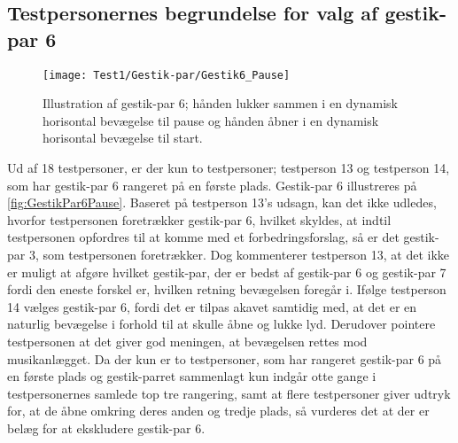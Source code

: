 \subsection{Testpersonernes begrundelse for valg af gestik-par 6}
\label{TestresultaterValgAfGestikkerBegrundelseGP6}
%
\begin{figure}[H]
	\centering
	\texttt{[image: Test1/Gestik-par/Gestik6\_Pause]}
	\caption{Illustration af gestik-par 6; hånden lukker sammen i en dynamisk horisontal bevægelse til pause og hånden åbner i en dynamisk horisontal bevægelse til start.}
	\label{fig:GestikPar6Pause}
\end{figure}
\noindent
%
Ud af 18 testpersoner, er der kun to testpersoner; testperson 13 og testperson 14, som har gestik-par 6 rangeret på en første plads. Gestik-par 6 illustreres på \autoref{fig:GestikPar6Pause}. Baseret på testperson 13's udsagn, kan det ikke udledes, hvorfor testpersonen foretrækker gestik-par 6, hvilket skyldes, at indtil testpersonen opfordres til at komme med et forbedringsforslag, så er det gestik-par 3, som testpersonen foretrækker. Dog kommenterer testperson 13, at det ikke er muligt at afgøre hvilket gestik-par, der er bedst af gestik-par 6 og gestik-par 7 fordi den eneste forskel er, hvilken retning bevægelsen foregår i. Ifølge testperson 14 vælges gestik-par 6, fordi det er tilpas akavet samtidig med, at det er en naturlig bevægelse i forhold til at skulle åbne og lukke lyd. Derudover pointere testpersonen at det giver god meningen, at bevægelsen rettes mod musikanlægget. Da der kun er to testpersoner, som har rangeret gestik-par 6 på en første plads og gestik-parret sammenlagt kun indgår otte gange i testpersonernes samlede top tre rangering, samt at flere testpersoner giver udtryk for, at de åbne omkring deres anden og tredje plads, så vurderes det at der er belæg for at ekskludere gestik-par 6. 
%
